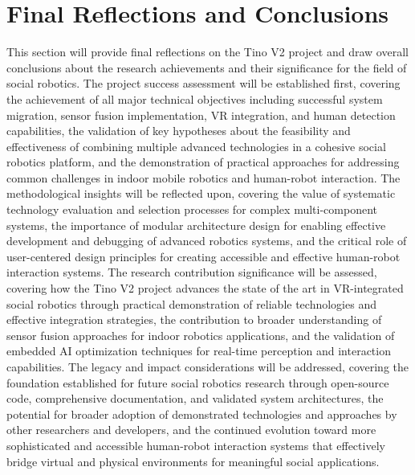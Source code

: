 \section{Final Reflections and Conclusions}
This section will provide final reflections on the Tino V2 project and draw overall conclusions about the research achievements and their significance for the field of social robotics. The project success assessment will be established first, covering the achievement of all major technical objectives including successful system migration, sensor fusion implementation, VR integration, and human detection capabilities, the validation of key hypotheses about the feasibility and effectiveness of combining multiple advanced technologies in a cohesive social robotics platform, and the demonstration of practical approaches for addressing common challenges in indoor mobile robotics and human-robot interaction. The methodological insights will be reflected upon, covering the value of systematic technology evaluation and selection processes for complex multi-component systems, the importance of modular architecture design for enabling effective development and debugging of advanced robotics systems, and the critical role of user-centered design principles for creating accessible and effective human-robot interaction systems. The research contribution significance will be assessed, covering how the Tino V2 project advances the state of the art in VR-integrated social robotics through practical demonstration of reliable technologies and effective integration strategies, the contribution to broader understanding of sensor fusion approaches for indoor robotics applications, and the validation of embedded AI optimization techniques for real-time perception and interaction capabilities. The legacy and impact considerations will be addressed, covering the foundation established for future social robotics research through open-source code, comprehensive documentation, and validated system architectures, the potential for broader adoption of demonstrated technologies and approaches by other researchers and developers, and the continued evolution toward more sophisticated and accessible human-robot interaction systems that effectively bridge virtual and physical environments for meaningful social applications.

